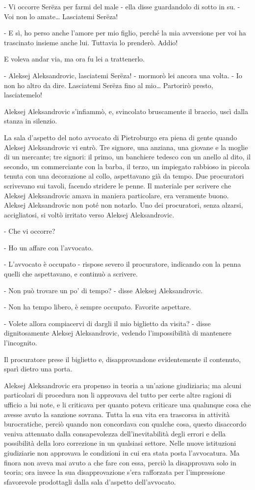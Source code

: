 - Vi occorre Serëza per farmi del male - ella disse guardandolo di sotto in su. - Voi non lo amate\ldots{} Lasciatemi Serëza! 

- E sì, ho perso anche l'amore per mio figlio, perché la mia avversione per voi ha trascinato insieme anche lui. Tuttavia lo prenderò. Addio! 

E voleva andar via, ma ora fu lei a trattenerlo. 

- Aleksej Aleksandrovic, lasciatemi Serëza! - mormorò lei ancora una volta. - Io non ho altro da dire. Lasciatemi Serëza fino al mio\ldots{} Partorirò presto, lasciatemelo! 

Aleksej Aleksandrovic s'infiammò, e, svincolato bruscamente il braccio, uscì dalla stanza in silenzio. 

\label{v-3} 

La sala d'aspetto del noto avvocato di Pietroburgo era piena di gente quando Aleksej Aleksandrovic vi entrò. Tre signore, una anziana, una giovane e la moglie di un mercante; tre signori: il primo, un banchiere tedesco con un anello al dito, il secondo, un commerciante con la barba, il terzo, un impiegato rabbioso in piccola tenuta con una decorazione al collo, aspettavano già da tempo. Due procuratori scrivevano sui tavoli, facendo stridere le penne. Il materiale per scrivere che Aleksej Aleksandrovic amava in maniera particolare, era veramente buono. Aleksej Aleksandrovic non poté non notarlo. Uno dei procuratori, senza alzarsi, accigliatosi, si voltò irritato verso Aleksej Aleksandrovic. 

- Che vi occorre? 

- Ho un affare con l'avvocato. 

- L'avvocato è occupato - rispose severo il procuratore, indicando con la penna quelli che aspettavano, e continuò a scrivere. 

- Non può trovare un po' di tempo? - disse Aleksej Aleksandrovic. 

- Non ha tempo libero, è sempre occupato. Favorite aspettare. 

- Volete allora compiacervi di dargli il mio biglietto da visita? - disse dignitosamente Aleksej Aleksandrovic, vedendo l'impossibilità di mantenere l'incognito. 

Il procuratore prese il biglietto e, disapprovandone evidentemente il contenuto, sparì dietro una porta. 

Aleksej Aleksandrovic era propenso in teoria a un'azione giudiziaria; ma alcuni particolari di procedura non li approvava del tutto per certe altre ragioni di ufficio a lui note, e li criticava per quanto poteva criticare una qualunque cosa che avesse avuto la sanzione sovrana. Tutta la sua vita era trascorsa in attività burocratiche, perciò quando non concordava con qualche cosa, questo disaccordo veniva attenuato dalla consapevolezza dell'inevitabilità degli errori e della possibilità della loro correzione in un qualsiasi settore. Nelle nuove istituzioni giudiziarie non approvava le condizioni in cui era stata posta l'avvocatura. Ma finora non aveva mai avuto a che fare con essa, perciò la disapprovava solo in teoria; ora invece la sua disapprovazione s'era rafforzata per l'impressione sfavorevole prodottagli dalla sala d'aspetto dell'avvocato. 

